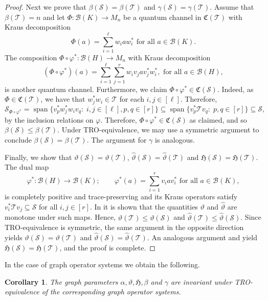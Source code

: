 \documentclass[11pt]{amsart}
\numberwithin{equation}{section}
\theoremstyle{plain}
\newtheorem{corollary}[theorem]{Corollary}
\theoremstyle{definition}
\theoremstyle{remark}
\newcommand{\B}{{\mathcal{B}}}
\renewcommand{\S}{{\mathcal{S}}}
\newcommand{\T}{{\mathcal{T}}}
\def\ga{\gamma}
\newcommand\vphi{\varphi}
\newcommand{\fC}{{\mathfrak{C}}}
\newcommand{\fH}{{\mathfrak{H}}}
\newcommand{\foral}{\text{ for all }}
\newcommand{\wh}{\widehat}
\newcommand{\spn}{\operatorname{span}}
\begin{document}
\begin{proof}
Next we prove that $\beta(\S) = \beta(\T)$ and $\ga(\S) = \ga(\T)$.
Assume that $\beta(\T) = n$ and let $\Phi\colon \B(K)\rightarrow M_{n}$ be a quantum channel in $\fC(\T)$ with Kraus decomposition 
\[
\Phi(a) = \sum_{i=1}^{\ell}w_{i}aw_{i}^* \foral a \in \B(K).
\]
The composition $\Phi\circ\vphi^{*} : \B(H)\rightarrow M_{n}$ with Kraus decomposition
\[
(\Phi\circ \vphi^{*})(a) = \sum\limits_{i=1}^{\ell}\sum\limits_{j=1}^{r}w_{i} v_{j} a v_{j}^* w_{i}^*, \foral a  \in \B(H),
\]
is another quantum channel. Furthermore, we claim $\Phi\circ \vphi^{*} \in \fC(\S)$. Indeed, as $\Phi \in \mathfrak{C}(\T)$, we have that $w_{j}^*w_{i} \in \T$ for each $i, j \in [\ell]$. Therefore, 
\[
\S_{\Phi\circ \vphi^{*}} = \spn\{v_{p}^*w_{j}^*w_{i}v_{q}: \; i, j \in [\ell], p, q \in [r]\} \subseteq \spn\{v_{p}^*\T v_{q}: \; p, q \in [r]\} \subseteq \S,
\]
by the inclusion relations on $\vphi$. Therefore, $\Phi\circ \vphi^{*} \in \fC(\S)$ as claimed, and so $\beta(\S) \leq \beta(\T)$. Under TRO-equivalence, we may use a symmetric argument to conclude $\beta(\S) = \beta(\T)$. The argument for $\ga$ is analogous.

Finally, we show that $\vartheta(\S)=\vartheta(\T)$,
$\wh{\vartheta}(\S)=\wh{\vartheta}(\T)$ and $\fH(\S) = \fH(\T)$.
The dual map 
\[
\vphi^*\colon \B(H)\to \B(K); \qquad \vphi^*(a)=\sum_{i=1}^{r}v_{i}av_{i}^* \foral a \in \B(K),
\]
is completely positive and trace-preserving and its Kraus operators satisfy $v_{i}^*\T v_{j} \subseteq \S$ for all $i, j \in [r]$. In \cite[Proposition 6.1]{BTW21} it is shown that the quantities $ \vartheta$ and $ \wh \vartheta$ are monotone under such maps. Hence, $\vartheta(\T)\le \vartheta(\S)
$ and $\wh{\vartheta}(\T)\le \wh{\vartheta}(\S)$. 
Since TRO-equivalence is symmetric, the same argument in the opposite direction yields $\vartheta(\S)=\vartheta(\T)$ and
$\wh{\vartheta}(\S)=\wh{\vartheta}(\T)$. An analogous argument and \cite[Proposition 12]{GL20} yield $\fH(\S) = \fH(\T)$, and the proof is complete.
\end{proof}

In the case of graph operator systems we obtain the following.

\begin{corollary}\label{cor:graph_parameter_invariance}
The graph parameters $\alpha, \vartheta, \fH, \beta$ and $\ga$ are invariant under TRO-equivalence of the corresponding graph operator systems. 
\end{corollary}
\end{document}
